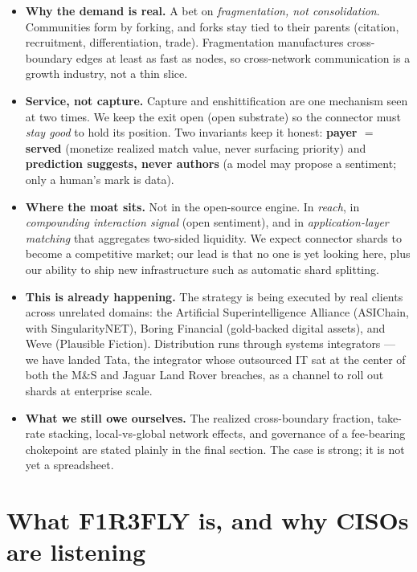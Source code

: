\documentclass[11pt]{article}
\newcommand{\invariant}[1]{\textbf{\color{accent}#1}}
\begin{document}
\begin{keybox}
\begin{itemize}[leftmargin=1.2em, itemsep=4pt, topsep=4pt]
  \item \textbf{Why the demand is real.} A bet on \emph{fragmentation, not consolidation}. Communities form by forking, and forks stay tied to their parents (citation, recruitment, differentiation, trade). Fragmentation manufactures cross-boundary edges at least as fast as nodes, so cross-network communication is a growth industry, not a thin slice.
  \item \textbf{Service, not capture.} Capture and enshittification are one mechanism seen at two times. We keep the exit open (open substrate) so the connector must \emph{stay good} to hold its position. Two invariants keep it honest: \invariant{payer $=$ served} (monetize realized match value, never surfacing priority) and \invariant{prediction suggests, never authors} (a model may propose a sentiment; only a human's mark is data).
  \item \textbf{Where the moat sits.} Not in the open-source engine. In \emph{reach}, in \emph{compounding interaction signal} (open sentiment), and in \emph{application-layer matching} that aggregates two-sided liquidity. We expect connector shards to become a competitive market; our lead is that no one is yet looking here, plus our ability to ship new infrastructure such as automatic shard splitting.
  \item \textbf{This is already happening.} The strategy is being executed by real clients across unrelated domains: the Artificial Superintelligence Alliance (ASIChain, with SingularityNET), Boring Financial (gold-backed digital assets), and Weve (Plausible Fiction). Distribution runs through systems integrators --- we have landed Tata, the integrator whose outsourced IT sat at the center of both the M\&S and Jaguar Land Rover breaches, as a channel to roll out shards at enterprise scale.
  \item \textbf{What we still owe ourselves.} The realized cross-boundary fraction, take-rate stacking, local-vs-global network effects, and governance of a fee-bearing chokepoint are stated plainly in the final section. The case is strong; it is not yet a spreadsheet.
\end{itemize}
\end{keybox}

\section{What F1R3FLY is, and why CISOs are listening}
\end{document}
